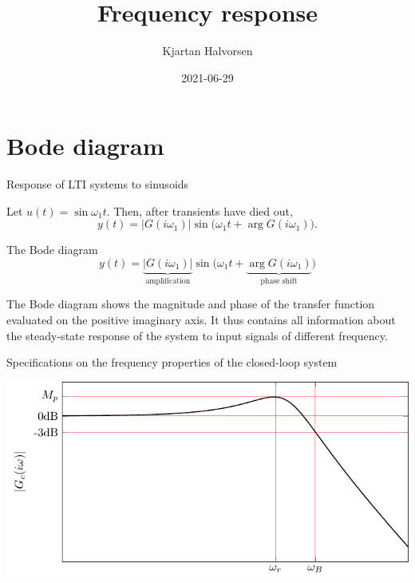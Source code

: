 \documentclass[presentation,aspectratio=169]{beamer}
\author{Kjartan Halvorsen}
\date{2021-06-29}
\title{Frequency response}
\begin{document}
\maketitle

\section{Bode diagram}
\label{sec:org11cd25a}

\begin{frame}[label={sec:org73f82b9}]{Response of LTI systems to sinusoids}
\begin{center}
\end{center}

Let \(u(t) = \sin\omega_1 t\). Then, after transients have died out,
\[ y(t) = |G(i\omega_1)| \sin \big( \omega_1 t + \arg G(i\omega_1)\big). \]
\end{frame}


\begin{frame}[label={sec:orgbe017dd}]{The Bode diagram}
\[ y(t) = \underbrace{|G(i\omega_1)|}_{\text{amplification}} \sin \big( \omega_1 t + \underbrace{\arg G(i\omega_1)}_{\text{phase shift}} \big) \]

The Bode diagram shows the magnitude and phase of the transfer function evaluated on the positive imaginary axis. It thus contains all information about the steady-state response of the system to input signals of different frequency.
\end{frame}


\begin{frame}[label={sec:orgb9e4790}]{Specifications on the frequency properties of the closed-loop system}
\begin{center}
\includegraphics[width=0.899\linewidth]{../../figures/spec-bode-closed-loop-new}
\end{center}
\end{frame}
\end{document}
